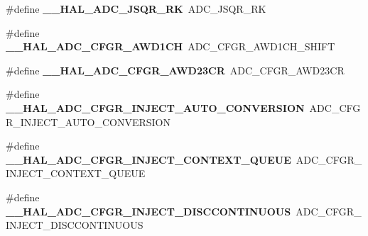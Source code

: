 \begin{DoxyCompactItemize}
\item 
\mbox{\label{group___h_a_l___a_d_c___aliased___macros_ga3f3d0f19ef64dab8816b7e4d563da42c}} 
\#define {\bfseries \+\_\+\+\_\+\+H\+A\+L\+\_\+\+A\+D\+C\+\_\+\+J\+S\+Q\+R\+\_\+\+RK}~A\+D\+C\+\_\+\+J\+S\+Q\+R\+\_\+\+RK
\item 
\mbox{\label{group___h_a_l___a_d_c___aliased___macros_gaf2b93300d6c91bbe5a0253368ade466f}} 
\#define {\bfseries \+\_\+\+\_\+\+H\+A\+L\+\_\+\+A\+D\+C\+\_\+\+C\+F\+G\+R\+\_\+\+A\+W\+D1\+CH}~A\+D\+C\+\_\+\+C\+F\+G\+R\+\_\+\+A\+W\+D1\+C\+H\+\_\+\+S\+H\+I\+FT
\item 
\mbox{\label{group___h_a_l___a_d_c___aliased___macros_ga73200fff4fe5aa62989ea33522fa3cfc}} 
\#define {\bfseries \+\_\+\+\_\+\+H\+A\+L\+\_\+\+A\+D\+C\+\_\+\+C\+F\+G\+R\+\_\+\+A\+W\+D23\+CR}~A\+D\+C\+\_\+\+C\+F\+G\+R\+\_\+\+A\+W\+D23\+CR
\item 
\mbox{\label{group___h_a_l___a_d_c___aliased___macros_ga16b4ff7c58c0fe8141bd8bf6adf0f27c}} 
\#define {\bfseries \+\_\+\+\_\+\+H\+A\+L\+\_\+\+A\+D\+C\+\_\+\+C\+F\+G\+R\+\_\+\+I\+N\+J\+E\+C\+T\+\_\+\+A\+U\+T\+O\+\_\+\+C\+O\+N\+V\+E\+R\+S\+I\+ON}~A\+D\+C\+\_\+\+C\+F\+G\+R\+\_\+\+I\+N\+J\+E\+C\+T\+\_\+\+A\+U\+T\+O\+\_\+\+C\+O\+N\+V\+E\+R\+S\+I\+ON
\item 
\mbox{\label{group___h_a_l___a_d_c___aliased___macros_ga5010d7820f890534d6b6005438038ef5}} 
\#define {\bfseries \+\_\+\+\_\+\+H\+A\+L\+\_\+\+A\+D\+C\+\_\+\+C\+F\+G\+R\+\_\+\+I\+N\+J\+E\+C\+T\+\_\+\+C\+O\+N\+T\+E\+X\+T\+\_\+\+Q\+U\+E\+UE}~A\+D\+C\+\_\+\+C\+F\+G\+R\+\_\+\+I\+N\+J\+E\+C\+T\+\_\+\+C\+O\+N\+T\+E\+X\+T\+\_\+\+Q\+U\+E\+UE
\item 
\mbox{\label{group___h_a_l___a_d_c___aliased___macros_gaeaa692ac73b859de118c28bc0327cf77}} 
\#define {\bfseries \+\_\+\+\_\+\+H\+A\+L\+\_\+\+A\+D\+C\+\_\+\+C\+F\+G\+R\+\_\+\+I\+N\+J\+E\+C\+T\+\_\+\+D\+I\+S\+C\+C\+O\+N\+T\+I\+N\+U\+O\+US}~A\+D\+C\+\_\+\+C\+F\+G\+R\+\_\+\+I\+N\+J\+E\+C\+T\+\_\+\+D\+I\+S\+C\+C\+O\+N\+T\+I\+N\+U\+O\+US
\item 
\mbox{\label{group___h_a_l___a_d_c___aliased___macros_gad118cacc67e8c3f930008f5aa6d8dade}} 

\end{DoxyCompactItemize}
